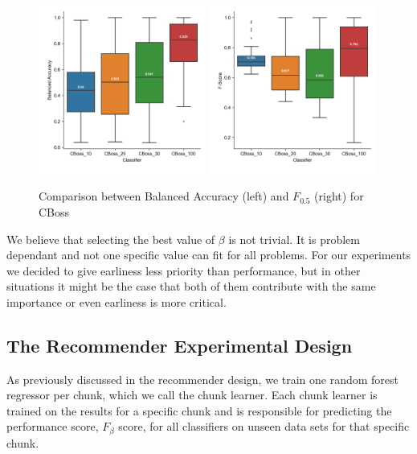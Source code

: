 \begin{figure}[!htbp]
  \captionsetup{justification=raggedright}
  \includegraphics[width=0.49\textwidth,keepaspectratio]{boxplot_accuracy_CBoss.png}
  \includegraphics[width=0.49\textwidth,keepaspectratio]{boxplot_f_score_05_CBoss.png}
  \caption{Comparison between Balanced Accuracy (left) and $F_{0.5}$ (right) for CBoss}
  \label{fig:FBeta05}
\end{figure}

We believe that selecting the best value of $\beta$ is not trivial.
It is problem dependant and not one specific value can fit for all problems.
For our experiments we decided to give earliness less priority than performance,
but in other situations it might be the case that both of them contribute with the same importance or even earliness is more critical.


\subsection{The Recommender Experimental Design}
\label{SubsectionRecommenderExperiment}
As previously discussed in the recommender design, we train one random forest regressor per chunk, which we call the chunk learner.
Each chunk learner is trained on the results for a specific chunk and is responsible for predicting the performance score, $F_{\beta}$ score, for all classifiers on unseen data sets for that specific chunk.

